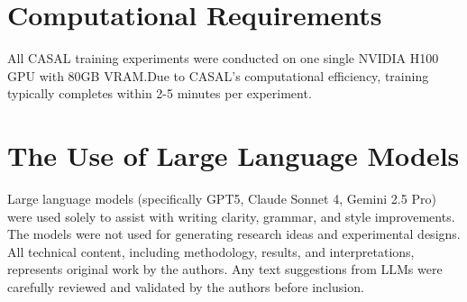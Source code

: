 \documentclass{article} %
\begin{document}
\section{Computational Requirements}
\label{app:comptational_req}
All CASAL training experiments were conducted on one single NVIDIA H100 GPU with 80GB VRAM.Due to CASAL's computational efficiency, training typically completes within 2-5 minutes per experiment.


\section{The Use of Large Language Models}
\label{app:llm_use}
Large language models (specifically GPT5, Claude Sonnet 4, Gemini 2.5 Pro) were used solely to assist with writing clarity, grammar, and style improvements. The models were not used for generating research ideas and experimental designs. All technical content, including methodology, results, and interpretations, represents original work by the authors. Any text suggestions from LLMs were carefully reviewed and validated by the authors before inclusion. 
\end{document}
